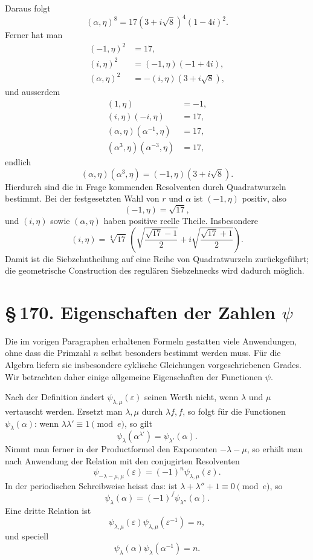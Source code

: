 \documentclass[11pt]{article}
\providecommand{\sect}[2]{\section*{\S\,#1. #2}}
\begin{document}
Daraus folgt
\[
        (\alpha,
\eta)^8=17(3+i\sqrt8)^4(1-4i)^2.                              \tag{19}
\]
Ferner hat man
\[
\begin{aligned}
        (-1,
\eta)^2&=17,\\
        (i,
\eta)^2&=(-1,
\eta)(-1+4i),\\
        (\alpha,
\eta)^2&=-(i,
\eta)(3+i\sqrt8),
\end{aligned}                                                          \tag{20}
\]
und ausserdem
\[
\begin{aligned}
        (1,
\eta)&=-1,\\
        (i,
\eta)(-i,
\eta)&=17,\\
        (\alpha,
\eta)(\alpha^{-1},
\eta)&=17,\\
        (\alpha^3,
\eta)(\alpha^{-3},
\eta)&=17,
\end{aligned}                                                          \tag{21}
\]
endlich
\[
        (\alpha,
\eta)(\alpha^3,
\eta)=(-1,
\eta)(3+i\sqrt8).                          \tag{22}
\]
Hierdurch sind die in Frage kommenden Resolventen durch Quadratwurzeln bestimmt. Bei der festgesetzten Wahl von $r$ und $\alpha$ ist $(-1,
\eta)$ positiv, also
\[
        (-1,
\eta)=\sqrt{17},
\]
und $ (i,
\eta)$ sowie $(\alpha,
\eta)$ haben positive reelle Theile. Insbesondere
\[
 (i,
\eta)=\sqrt[4]{17}
 \,\left(
 \sqrt{\frac{\sqrt{17}-1}{2}}+i\sqrt{\frac{\sqrt{17}+1}{2}}
 \right).                                                       \tag{23}
\]
Damit ist die Siebzehntheilung auf eine Reihe von Quadratwurzeln zurückgeführt; die geometrische Construction des regulären Siebzehnecks wird dadurch möglich.

\sect{170}{Eigenschaften der Zahlen $\psi$}

Die im vorigen Paragraphen erhaltenen Formeln gestatten viele Anwendungen, ohne dass die Primzahl $n$ selbst besonders bestimmt werden muss. Für die Algebra liefern sie insbesondere cyklische Gleichungen vorgeschriebenen Grades. Wir betrachten daher einige allgemeine Eigenschaften der Functionen $\psi$.

Nach der Definition ändert $\psi_{\lambda,\mu}(\varepsilon)$ seinen Werth nicht, wenn $\lambda$ und $\mu$ vertauscht werden. Ersetzt man $\lambda,\mu$ durch $\lambda f,f$, so folgt für die Functionen $\psi_\lambda(\alpha)$: wenn $\lambda\lambda'\equiv1\pmod e$, so gilt
\[
        \psi_\lambda(\alpha^{\lambda'})=\psi_{\lambda'}(\alpha).        \tag{1}
\]
Nimmt man ferner in der Productformel den Exponenten $-\lambda-
\mu$, so erhält man nach Anwendung der Relation mit den conjugirten Resolventen
\[
        \psi_{-\lambda-
\mu,
\mu}(\varepsilon)=(-1)^n\psi_{\lambda,
\mu}(\varepsilon).
\]
In der periodischen Schreibweise heisst das: ist $\lambda+
\lambda''+1\equiv0\pmod e$, so
\[
        \psi_\lambda(\alpha)=(-1)^f\psi_{\lambda''}(\alpha).            \tag{2}
\]
Eine dritte Relation ist
\[
        \psi_{\lambda,
\mu}(\varepsilon)
        \psi_{\lambda,
\mu}(\varepsilon^{-1})=n,                     \tag{3}
\]
und speciell
\[
        \psi_\lambda(\alpha)\psi_\lambda(\alpha^{-1})=n.                \tag{4}
\]
\end{document}
